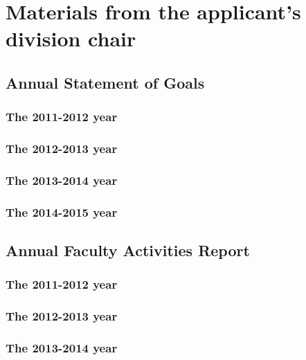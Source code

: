 \documentclass[ openright,titlepage,numbers=noenddot,headinclude,%
                footinclude=true,cleardoublepage=empty,abstractoff, 
                BCOR=5mm,paper=letter,fontsize=11pt,%
                ngerman, american, %
                ]{scrreprt}
\begin{document}
\chapter{Materials from the applicant's division chair}

\section{Annual Statement of Goals}
\subsection{The 2011-2012 year}

\subsection{The 2012-2013 year}

\subsection{The 2013-2014 year}

\subsection{The 2014-2015 year}



\section{Annual Faculty Activities Report}
\subsection{The 2011-2012 year}

\subsection{The 2012-2013 year}

\subsection{The 2013-2014 year}


\end{document}
